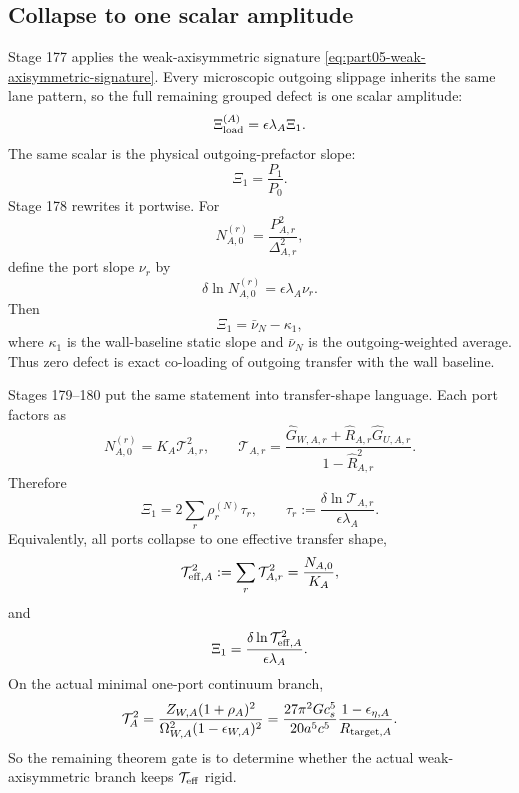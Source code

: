 \subsection{Collapse to one scalar amplitude}
Stage 177 applies the weak-axisymmetric signature \eqref{eq:part05-weak-axisymmetric-signature}.  Every microscopic outgoing slippage inherits the same lane pattern, so the full remaining grouped defect is one scalar amplitude:
\begin{equation}
\label{eq:part05-Xi1-definition}
\Xi_{\rm load}^{(A)}=\epsilon\lambda_A\Xi_1.
\end{equation}
The same scalar is the physical outgoing-prefactor slope:
\begin{equation}
\label{eq:part05-Xi1-P1P0}
\Xi_1=\frac{P_1}{P_0}.
\end{equation}
Stage 178 rewrites it portwise.  For
\begin{equation}
\label{eq:part05-port-N-static}
N_{A,0}^{(r)}=\frac{P_{A,r}^2}{\Delta_{A,r}^2},
\end{equation}
define the port slope \(\nu_r\) by
\begin{equation}
\label{eq:part05-nu-r-def}
\delta\ln N_{A,0}^{(r)}=\epsilon\lambda_A\nu_r.
\end{equation}
Then
\begin{equation}
\label{eq:part05-Xi1-port-coloading}
\Xi_1=\bar\nu_N-\kappa_1,
\end{equation}
where \(\kappa_1\) is the wall-baseline static slope and \(\bar\nu_N\) is the outgoing-weighted average.  Thus zero defect is exact co-loading of outgoing transfer with the wall baseline.

Stages 179--180 put the same statement into transfer-shape language.  Each port factors as
\begin{equation}
\label{eq:part05-port-transfer-shape}
N_{A,0}^{(r)}=K_A\mathcal T_{A,r}^2,
\qquad
\mathcal T_{A,r}
=
\frac{\widehat G_{W,A,r}+\widehat R_{A,r}\widehat G_{U,A,r}}{1-\widehat R_{A,r}^2}.
\end{equation}
Therefore
\begin{equation}
\label{eq:part05-Xi1-transfer-shape-sum}
\Xi_1=2\sum_r\rho_r^{(N)}\tau_r,
\qquad
\tau_r:=\frac{\delta\ln\mathcal T_{A,r}}{\epsilon\lambda_A}.
\end{equation}
Equivalently, all ports collapse to one effective transfer shape,
\begin{equation}
\label{eq:part05-Teff-def}
\mathcal T_{{\rm eff},A}^2
:=
\sum_r\mathcal T_{A,r}^2
=
\frac{N_{A,0}}{K_A},
\end{equation}
and
\begin{equation}
\label{eq:part05-Xi1-Teff}
\Xi_1
=
\frac{\delta\ln\mathcal T_{{\rm eff},A}^2}{\epsilon\lambda_A}.
\end{equation}
On the actual minimal one-port continuum branch,
\begin{equation}
\label{eq:part05-T-one-port-continuum}
\mathcal T_A^2
=
\frac{Z_{W,A}(1+\rho_A)^2}{\Omega_{W,A}^2(1-\epsilon_{W,A})^2}
=
\frac{27\pi^2Gc_s^5}{20a^5c^5}
\frac{1-\epsilon_{\eta,A}}{R_{{\rm target},A}}.
\end{equation}
So the remaining theorem gate is to determine whether the actual weak-axisymmetric branch keeps \(\mathcal T_{{\rm eff}}\) rigid.

